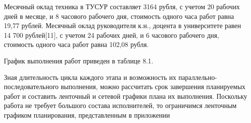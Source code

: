 Месячный оклад техника в ТУСУР составляет 3164 рубля, с учетом 20 рабочих дней в месяце, и 8 часового рабочего дня, стоимость одного часа работ равна 19,77 рублей. Месячный оклад руководителя к.н., доцента в университете равен 14 700 рублей[11], с учетом 24 рабочих дней, и 6 часового рабочего дня, стоимость одного часа работ равна 102,08 рубля.

График выполнения работ приведен в таблице 8.1.

Зная длительность цикла каждого этапа и возможность их параллельно-последовательного выполнения, можно рассчитать срок завершения планируемых работ и составить ленточный и сетевой графики плана их выполнения. Поскольку работа не требует большого состава исполнителей, то ограничимся ленточным графиком планирования, представленным в приложении %

 